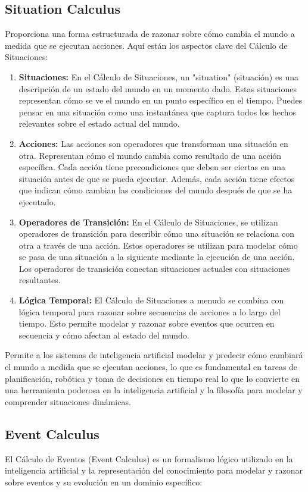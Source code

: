 \subsection{Situation Calculus}
Proporciona una forma estructurada de razonar sobre cómo cambia el mundo a medida que se ejecutan acciones. Aquí están los aspectos clave del Cálculo de Situaciones:

\begin{enumerate}
  \item \textbf{Situaciones: }En el Cálculo de Situaciones, un "situation" (situación) es una descripción de un estado del mundo en un momento dado. Estas situaciones representan cómo se ve el mundo en un punto específico en el tiempo. Puedes pensar en una situación como una instantánea que captura todos los hechos relevantes sobre el estado actual del mundo.
  \item \textbf{Acciones: }Las acciones son operadores que transforman una situación en otra. Representan cómo el mundo cambia como resultado de una acción específica. Cada acción tiene precondiciones que deben ser ciertas en una situación antes de que se pueda ejecutar. Además, cada acción tiene efectos que indican cómo cambian las condiciones del mundo después de que se ha ejecutado.
  \item \textbf{Operadores de Transición: }En el Cálculo de Situaciones, se utilizan operadores de transición para describir cómo una situación se relaciona con otra a través de una acción. Estos operadores se utilizan para modelar cómo se pasa de una situación a la siguiente mediante la ejecución de una acción. Los operadores de transición conectan situaciones actuales con situaciones resultantes.
  \item \textbf{Lógica Temporal: }El Cálculo de Situaciones a menudo se combina con lógica temporal para razonar sobre secuencias de acciones a lo largo del tiempo. Esto permite modelar y razonar sobre eventos que ocurren en secuencia y cómo afectan al estado del mundo. 
\end{enumerate}

Permite a los sistemas de inteligencia artificial modelar y predecir cómo cambiará el mundo a medida que se ejecutan acciones, lo que es fundamental en tareas de planificación, robótica y toma de decisiones en tiempo real lo que lo convierte en una herramienta poderosa en la inteligencia artificial y la filosofía para modelar y comprender situaciones dinámicas.


\subsection{Event Calculus}
El Cálculo de Eventos (Event Calculus) es un formalismo lógico utilizado en la inteligencia artificial y la representación del conocimiento para modelar y razonar sobre eventos y su evolución en un dominio específico: 

